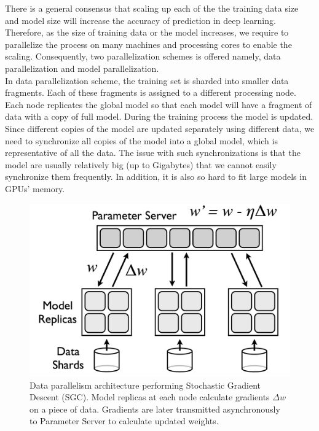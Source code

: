 \documentclass[runningheads,a4paper]{llncs}
\begin{document}
There is a general consensus that scaling up each of the the training data size and model size will increase the accuracy of prediction in deep learning. Therefore, as the size of training data or the model increases, we require to parallelize the process on many machines and processing cores to enable the scaling. Consequently, two parallelization schemes is offered namely, data parallelization and model parallelization.\\

In data parallelization scheme, the training set is sharded into smaller data fragments. Each of these fragments is assigned to a different processing node. Each node replicates the global model so that each model will have a fragment of data with a copy of full model. During the training process the model is updated. Since different copies of the model are updated separately using different data, we need to synchronize all copies of the model into a global model, which is representative of all the data. The issue with such synchronizations is that the model are usually relatively big (up to Gigabytes) that we cannot easily synchronize them frequently. In addition, it is also so hard to fit large models in GPUs' memory. \\
\begin{figure}[h]
	\includegraphics[scale=0.3]{./images/data_parallelism.png}
	\centering
	\caption{Data parallelism architecture performing Stochastic Gradient Descent (SGC). Model replicas at each node calculate gradients $\Delta w $ on a piece of data. Gradients are later transmitted asynchronously to Parameter Server to calculate updated weights.}
	\label{fig:data_parallelism}
\end{figure}
\end{document}
